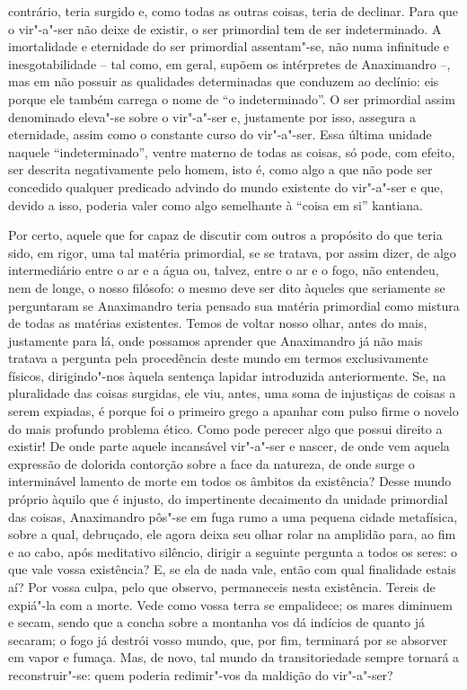 contrário, teria surgido e, como todas as outras coisas, teria de
declinar. Para que o vir"-a"-ser não deixe de existir, o ser primordial
tem de ser indeterminado. A imortalidade e eternidade do ser primordial
assentam"-se, não numa infinitude e inesgotabilidade -- tal como, em
geral, supõem os intérpretes de Anaximandro --, mas em não possuir as
qualidades determinadas que conduzem ao declínio: eis porque ele também
carrega o nome de ``o indeterminado''. O ser primordial assim denominado
eleva"-se sobre o vir"-a"-ser e, justamente por isso, assegura a
eternidade, assim como o constante curso do vir"-a"-ser. Essa última \label{essaultimaunidade}
unidade naquele ``indeterminado'', ventre materno de todas as coisas, só
pode, com efeito, ser descrita negativamente pelo homem, isto é, como
algo a que não pode ser concedido qualquer predicado advindo do mundo
existente do vir"-a"-ser e que, devido a isso, poderia valer como algo
semelhante à ``coisa em si'' kantiana.

Por certo, aquele que for capaz de discutir com outros a propósito do
que teria sido, em rigor, uma tal matéria primordial, se se tratava,
por assim dizer, de algo intermediário entre o ar e a água ou, talvez,
entre o ar e o fogo, não entendeu, nem de longe, o nosso filósofo:  o
mesmo deve ser dito àqueles que seriamente se perguntaram se
Anaximandro teria pensado sua matéria primordial como mistura de todas
as matérias existentes. Temos de voltar nosso olhar, antes do mais,
justamente para lá, onde possamos aprender que Anaximandro já não mais
tratava a pergunta pela procedência deste mundo em termos
exclusivamente físicos, dirigindo"-nos àquela sentença lapidar
introduzida anteriormente. Se, na pluralidade das coisas surgidas, ele
viu, antes, uma soma de injustiças de coisas a serem expiadas, é porque
foi o primeiro grego a apanhar com pulso firme o novelo do mais
profundo problema ético. Como pode perecer algo que possui direito a
existir! De onde parte aquele incansável vir"-a"-ser e nascer, de onde
vem aquela expressão de dolorida contorção sobre a face da natureza, de
onde surge o interminável lamento de morte em todos os âmbitos da
existência? Desse mundo próprio àquilo que é injusto, do impertinente
decaimento da unidade primordial das coisas, Anaximandro pôs"-se em fuga
rumo a uma pequena cidade metafísica, sobre a qual, debruçado, ele
agora deixa seu olhar rolar na amplidão para, ao fim e ao cabo, após
meditativo silêncio, dirigir a seguinte pergunta a todos os seres: o
que vale vossa existência? E, se ela de nada vale, então com qual \label{oquevale}
finalidade estais aí? Por vossa culpa, pelo que observo, permaneceis
nesta existência. Tereis de expiá"-la com a morte. Vede como vossa
terra se empalidece; os mares diminuem e secam, sendo que a concha
sobre a montanha vos dá indícios de quanto já secaram; o fogo já
destrói vosso mundo, que, por fim, terminará por se absorver em vapor e
fumaça. Mas, de novo, tal mundo da transitoriedade sempre tornará a
reconstruir"-se: quem poderia redimir"-vos da maldição do vir"-a"-ser?

